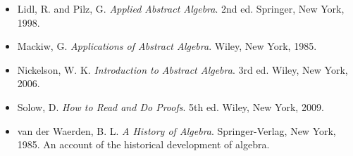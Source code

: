 {\begin{itemize}
\item[{ \bf [10]}] %
Lidl, R. and Pilz, G. 
{\it Applied Abstract Algebra}. 2nd ed. Springer,
New York, 1998. 
 
\item[{ \bf [11]}] %
Mackiw, G. {\it Applications of Abstract Algebra}. Wiley, New York,
1985. 
 
\item[{ \bf [12]}]
Nickelson, W. K. %
{\it Introduction to Abstract Algebra}. 3rd ed. Wiley, New York,
2006. 
 
 
\item[{ \bf [13]}] %
Solow, D. 
{\it How to Read and Do Proofs}. 5th ed. Wiley, New York,
2009. 
 
\item[{ \bf [14]}] %
van der Waerden, B. L. 
{\it A History of Algebra}. Springer-Verlag,
New York, 1985. An account of the historical development of algebra. 




 
 
\end{itemize}
}
 
\sagesection
